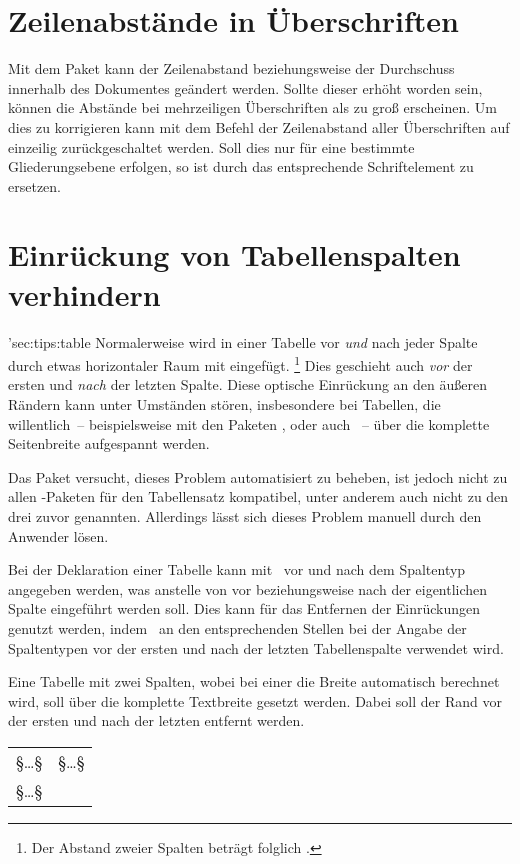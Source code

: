 \section{Zeilenabstände in Überschriften}
\label{sec:tips:headings}
Mit dem Paket  kann der Zeilenabstand beziehungsweise der 
Durchschuss innerhalb des Dokumentes geändert werden. Sollte dieser erhöht 
worden sein, können die Abstände bei mehrzeiligen Überschriften als zu groß 
erscheinen. Um dies zu korrigieren kann mit dem Befehl %
 der 
Zeilenabstand aller Überschriften auf einzeilig zurückgeschaltet werden. Soll 
dies nur für eine bestimmte Gliederungsebene erfolgen, so ist 
 durch das entsprechende Schriftelement zu ersetzen.



\section{Einrückung von Tabellenspalten verhindern}%
\manualhyperdef'{sec:tips:table}
%
Normalerweise wird in einer Tabelle vor \emph{und} nach jeder Spalte durch 
 etwas horizontaler Raum mit  
eingefügt.%
\footnote{%
  Der Abstand zweier Spalten beträgt folglich .%
}
Dies geschieht auch \emph{vor} der ersten und \emph{nach} der letzten Spalte. 
Diese optische Einrückung an den äußeren Rändern kann unter Umständen stören, 
insbesondere bei Tabellen, die willentlich~-- beispielsweise mit den Paketen 
,  oder auch ~-- über die 
komplette Seitenbreite aufgespannt werden.

Das Paket  versucht, dieses Problem automatisiert zu 
beheben, ist jedoch nicht zu allen -Paketen für den Tabellensatz 
kompatibel, unter anderem auch nicht zu den drei zuvor genannten. Allerdings 
lässt sich dieses Problem manuell durch den Anwender lösen. 

Bei der Deklaration einer Tabelle kann mit~\PParameter{\dots} vor und 
nach dem Spaltentyp angegeben werden, was anstelle von  vor 
beziehungsweise nach der eigentlichen Spalte eingeführt werden soll. Dies kann 
für das Entfernen der Einrückungen genutzt werden, indem~ an den 
entsprechenden Stellen bei der Angabe der Spaltentypen vor der ersten und nach 
der letzten Tabellenspalte verwendet wird.
%
\begin{Example}
Eine Tabelle mit zwei Spalten, wobei bei einer die Breite automatisch berechnet 
wird, soll über die komplette Textbreite gesetzt werden. Dabei soll der Rand 
vor der ersten und nach der letzten entfernt werden.
\begin{Code}[escapechar=§]
\begin{tabularx}{\textwidth}{@{}lX@{}}
§\dots§ & §\dots§ \tabularnewline
§\dots§
\end{tabularx}
\end{Code}
\end{Example}



